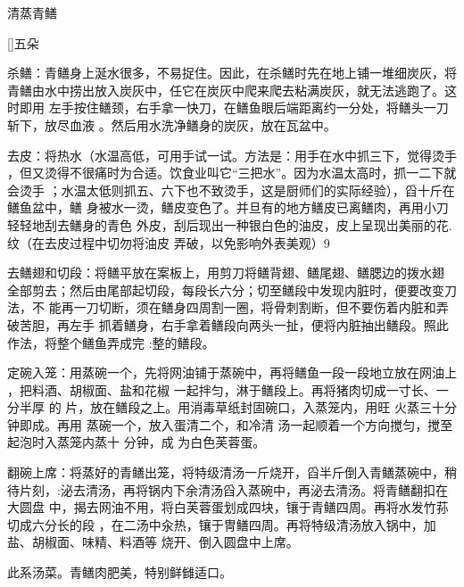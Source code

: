 \begin{recipe}{清蒸青鳝}

\ingredients


[\footnotemark]{五朵}

\preparation

\step 杀鳝：青鳝身上涎水很多，不易捉住。因此，在杀鳝时先在地上铺一堆细炭灰，将
青鳝由水中捞出放入炭灰中，任它在炭灰中爬来爬去粘满炭灰，就无法逃跑了。这时即用
左手按住鳝颈，右手拿一快刀，在鳝鱼眼后端距离约一分处，将鳝头一刀斩下，放尽血液
。然后用水洗净鳝身的炭灰，放在瓦盆中。

\step 去皮：将热水（水温高低，可用手试一试。方法是：用手在水中抓三下，觉得烫手
，但又烫得不很痛时为合适。饮食业叫它“三把水”。因为水温太高时，抓一二下就会烫手
；水温太低则抓五、六下也不致烫手，这是厨师们的实际经验），舀十斤在鳝鱼盆中，鳝
身被水一烫，鳝皮变色了。并旦有的地方鳝皮已离鳝肉，再用小刀轻轻地刮去鳝身的青色
外皮，刮后现出一种银白色的油皮，皮上呈现岀美丽的花.纹（在去皮过程中切勿将油皮
弄破，以免影响外表美观）9

\step 去鳝翅和切段：将鳝平放在案板上，用剪刀将鳝背翅、鳝尾翅、鳝腮边的拨水翅
全部剪去；然后由尾部起切段，每段长六分；切至鳝段中发现内脏时，便要改变刀法，不
能再一刀切断，须在鳝身四周割一圈，将骨刺割断，但不要伤着内脏和弄破苦胆，再左手
抓着鳝身，右手拿着鳝段向两头一扯，便将内脏抽出鳝段。照此作法，将整个鳝鱼弄成完
:整的鳝段。

\step 定碗入笼：用蒸碗一个，先将网油铺于蒸碗中，再将鳝鱼一段一段地立放在网油上
，把料酒、胡椒面、盐和花椒 一起拌匀，淋于鳝段上。再将猪肉切成一寸长、一分半厚
的 片，放在鳝段之上。用消毒草纸封固碗口，入蒸笼内，用旺 火蒸三十分钟即成。再用
蒸碗一个，放入蛋清二个，和冷清 汤一起顺着一个方向搅匀，搅至起泡时入蒸笼内蒸十
分钟，成 为白色芙蓉蛋。

\step 翻碗上席：将蒸好的青鳝出笼，将特级清汤一斤烧开，舀半斤倒入青鳝蒸碗中，稍
待片刻，:泌去清汤，再将锅内下余清汤舀入蒸碗中，再泌去清汤。将青鳝翻扣在大圆盘
中，揭去网油不用，将白芙蓉蛋划成四块，镶于青鳝四周。再将水发竹荪切成六分长的段
，在二汤中汆热，镶于冑鳝四周。再将特级清汤放入锅中，加盐、胡椒面、味精、料酒等
烧开、倒入圆盘中上席。

\features

此系汤菜。青鳝肉肥美，特别鲜雠适口。


\end{recipe}


